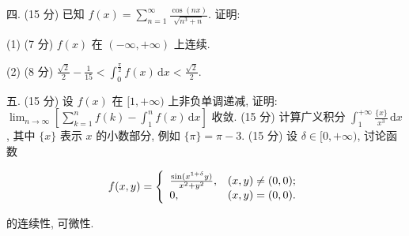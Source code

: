 \documentclass{examcollection}
\renewcommand{\displayformula}[1]{\[#1\]}
\begin{document}
{\begin{minipage}{\textwidth}
四. (15 分) 已知 $f(x) = \sum_{n=1}^{\infty} \frac{\cos(nx)}{\sqrt{n^3 + n}}$. 证明:\par
(1) (7 分) $f(x)$ 在 $(- \infty, + \infty)$ 上连续.\par
(2) (8 分) $\frac{\sqrt{2}}{2} - \frac{1}{15} < \int_{0}^{\frac{\pi}{2}} f(x) \, \mathrm{d}x < \frac{\sqrt{2}}{2}$.\par
五. (15 分) 设 $f(x)$ 在 $[1, +\infty)$ 上非负单调递减, 证明: $\lim_{n \to \infty} \left[ \sum_{k=1}^{n} f(k) - \int_{1}^{n} f(x) \, \mathrm{d}x \right]$ 收敛.
(15 分) 计算广义积分 $\int_{1}^{+\infty} \frac{\{x\}}{x^3} \, \mathrm{d}x$, 其中 $\{x\}$ 表示 $x$ 的小数部分, 例如 $\{\pi\} = \pi - 3$.
(15 分) 设 $\delta \in [0, +\infty)$, 讨论函数\par
\displayformula{f (x, y) = \left\{ \begin{array}{l l} \frac {\sin (x ^ {1 + \delta} y)}{x ^ {2} + y ^ {2}}, & (x, y) \neq (0, 0); \\ 0, & (x, y) = (0, 0). \end{array} \right.}\par
的连续性, 可微性.\par
\end{minipage}}
\ifdim\dimexpr\ht\proofbox+\dp\proofbox\relax>\textheight
\noindent\resizebox{!}{\textheight}{\usebox{\proofbox}}\else\noindent\usebox{\proofbox}\fi\clearpage
\end{document}
